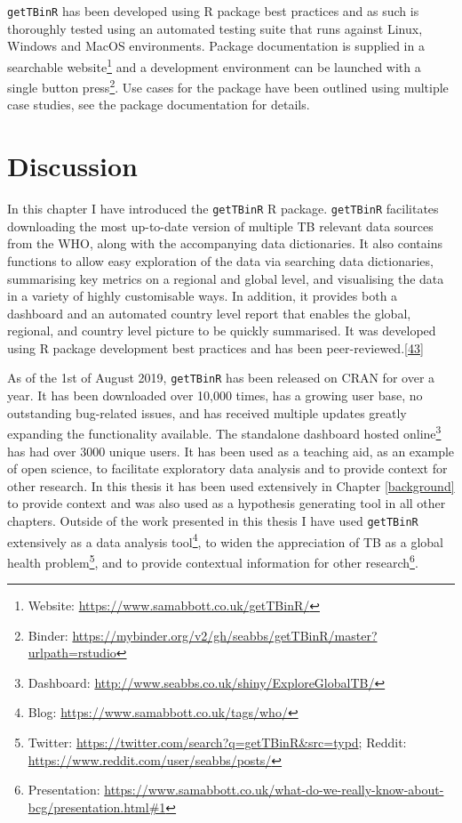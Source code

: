 \documentclass[11pt,twoside]{bristolthesis}
\begin{document}
  \texttt{getTBinR} has been developed using R package best practices and as such is thoroughly tested using an automated testing suite that runs against Linux, Windows and MacOS environments. Package documentation is supplied in a searchable website\footnote{Website: \url{https://www.samabbott.co.uk/getTBinR/}} and a development environment can be launched with a single button press\footnote{Binder: \url{https://mybinder.org/v2/gh/seabbs/getTBinR/master?urlpath=rstudio}}. Use cases for the package have been outlined using multiple case studies, see the package documentation for details.
  
  \hypertarget{discussion}{%
  \section{Discussion}\label{discussion}}
  
  In this chapter I have introduced the \texttt{getTBinR} R package. \texttt{getTBinR} facilitates downloading the most up-to-date version of multiple TB relevant data sources from the WHO, along with the accompanying data dictionaries. It also contains functions to allow easy exploration of the data via searching data dictionaries, summarising key metrics on a regional and global level, and visualising the data in a variety of highly customisable ways. In addition, it provides both a dashboard and an automated country level report that enables the global, regional, and country level picture to be quickly summarised. It was developed using R package development best practices and has been peer-reviewed.{[}\protect\hyperlink{ref-Abbott:2018}{43}{]}
  
  As of the 1st of August 2019, \texttt{getTBinR} has been released on CRAN for over a year. It has been downloaded over 10,000 times, has a growing user base, no outstanding bug-related issues, and has received multiple updates greatly expanding the functionality available. The standalone dashboard hosted online\footnote{Dashboard: \url{http://www.seabbs.co.uk/shiny/ExploreGlobalTB/}} has had over 3000 unique users. It has been used as a teaching aid, as an example of open science, to facilitate exploratory data analysis and to provide context for other research. In this thesis it has been used extensively in Chapter \ref{background} to provide context and was also used as a hypothesis generating tool in all other chapters. Outside of the work presented in this thesis I have used \texttt{getTBinR} extensively as a data analysis tool\footnote{Blog: \url{https://www.samabbott.co.uk/tags/who/}}, to widen the appreciation of TB as a global health problem\footnote{Twitter: \url{https://twitter.com/search?q=getTBinR\&src=typd}; Reddit: \url{https://www.reddit.com/user/seabbs/posts/}}, and to provide contextual information for other research\footnote{Presentation: \url{https://www.samabbott.co.uk/what-do-we-really-know-about-bcg/presentation.html\#1}}.
  
\end{document}
